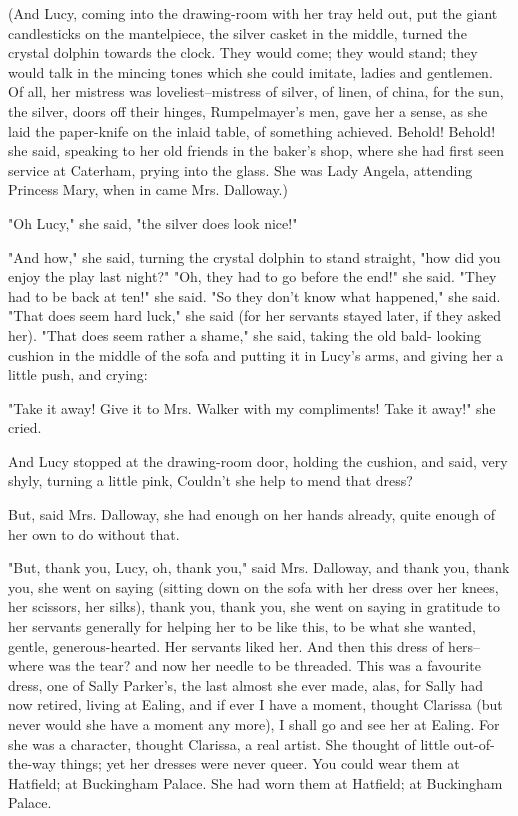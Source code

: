 \documentclass[lang=cn,10pt]{elegantbook}
\begin{document}
(And Lucy, coming into the drawing-room with her tray held out, put
the giant candlesticks on the mantelpiece, the silver casket in the
middle, turned the crystal dolphin towards the clock.  They would
come; they would stand; they would talk in the mincing tones which
she could imitate, ladies and gentlemen.  Of all, her mistress was
loveliest--mistress of silver, of linen, of china, for the sun, the
silver, doors off their hinges, Rumpelmayer's men, gave her a
sense, as she laid the paper-knife on the inlaid table, of
something achieved.  Behold!  Behold! she said, speaking to her old
friends in the baker's shop, where she had first seen service at
Caterham, prying into the glass.  She was Lady Angela, attending
Princess Mary, when in came Mrs. Dalloway.)

"Oh Lucy," she said, "the silver does look nice!"

"And how," she said, turning the crystal dolphin to stand straight,
"how did you enjoy the play last night?"  "Oh, they had to go
before the end!" she said.  "They had to be back at ten!" she said.
"So they don't know what happened," she said.  "That does seem hard
luck," she said (for her servants stayed later, if they asked her).
"That does seem rather a shame," she said, taking the old bald-
looking cushion in the middle of the sofa and putting it in Lucy's
arms, and giving her a little push, and crying:

"Take it away!  Give it to Mrs. Walker with my compliments!  Take
it away!" she cried.

And Lucy stopped at the drawing-room door, holding the cushion, and
said, very shyly, turning a little pink, Couldn't she help to mend
that dress?

But, said Mrs. Dalloway, she had enough on her hands already, quite
enough of her own to do without that.

"But, thank you, Lucy, oh, thank you," said Mrs. Dalloway, and
thank you, thank you, she went on saying (sitting down on the sofa
with her dress over her knees, her scissors, her silks), thank you,
thank you, she went on saying in gratitude to her servants
generally for helping her to be like this, to be what she wanted,
gentle, generous-hearted.  Her servants liked her.  And then this
dress of hers--where was the tear? and now her needle to be
threaded.  This was a favourite dress, one of Sally Parker's, the
last almost she ever made, alas, for Sally had now retired, living
at Ealing, and if ever I have a moment, thought Clarissa (but never
would she have a moment any more), I shall go and see her at
Ealing.  For she was a character, thought Clarissa, a real artist.
She thought of little out-of-the-way things; yet her dresses were
never queer.  You could wear them at Hatfield; at Buckingham
Palace.  She had worn them at Hatfield; at Buckingham Palace.
\end{document}
